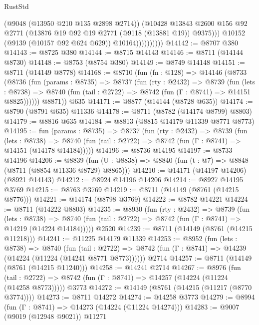 \begin{lexlean}{RustStd}
\begin{coremodule}
                          (@9048 (@13950 @210 @135 @2898 @2714))
                          (@10428
                            @13843
                            @2600
                            @156
                            @92
                            @2771
                            (@13876 @19 @92 @19 @2771 (@9118 (@13881 @19)) @9375)))
                        @10152
                        (@9139 (@10157 @92 @624 @629))
                        @10164))))))))))
@14142 := @8707 @380
@14143 := @8725 @380
@14144 := @8715 @14143
@14146 := @8711 (@14144 @8730)
@14148 := @8753 (@8754 @380)
@14149 := @8749 @14148
@14151 := @8711 (@14149 @8778)
@14168 := @8710
    (fun (fn : @128) =>
    @14146
      (@8733
        (@8736
          (fun (params : @8735) =>
          @8737
            (fun (rty : @2432) =>
            @8739
              (fun (lets : @8738) =>
              @8740 (fun (tail : @2722) => @8742 (fun (Γ : @8741) => @14151 @8825))))))
        @8871))
    @635
@14171 := @8877 (@14144 (@8728 @635))
@14174 := @8790 (@8791 @635) @11336
@14178 := @8711 (@8782 (@14174 @8799) @8803)
@14179 := @8816 @635
@14184 := @8813 (@8815 @14179 @11339 @8771 @8773)
@14195 := fun (params : @8735) =>
  @8737
    (fun (rty : @2432) =>
    @8739
      (fun (lets : @8738) =>
      @8740 (fun (tail : @2722) => @8742 (fun (Γ : @8741) => @14151 (@14178 @14184)))))
@14196 := @8736 @14195
@14197 := @8733 @14196
@14206 := @8839
    (fun (U : @8838) => @8840 (fun (t : @7) => @8848 (@8711 (@8854 @11336 @8729) @8865)))
@14210 := @14171 (@14197 @14206) (@8921 @14143)
@14212 := @8924 @14196 @14206
@14214 := @8927 @14195 @3769
@14215 := @8763 @3769
@14219 := @8711 (@14149 (@8761 (@14215 @8776)))
@14221 := @14174 (@8798 @3769)
@14222 := @8782 @14221
@14224 := @8711 (@14222 @8803)
@14235 := @8930
    (fun (rty : @2432) =>
    @8739
      (fun (lets : @8738) =>
      @8740 (fun (tail : @2722) => @8742 (fun (Γ : @8741) => @14219 (@14224 @14184)))))
    @2520
@14239 := @8711 (@14149 (@8761 (@14215 @11218)))
@14241 := @11225 @14179 @11339
@14253 := @8952
    (fun (lets : @8738) =>
    @8740
      (fun (tail : @2722) =>
      @8742 (fun (Γ : @8741) => @14239 (@14224 (@11224 (@14241 @8771 @8773))))))
    @2714
@14257 := @8711 (@14149 (@8761 (@14215 @11240)))
@14258 := @14241 @2714
@14267 := @8976
    (fun (tail : @2722) => @8742 (fun (Γ : @8741) => @14257 (@14224 (@11224 (@14258 @8773)))))
    @3773
@14272 := @14149 (@8761 (@14215 (@11217 (@8770 @3774))))
@14273 := @8711 @14272
@14274 := @14258 @3773
@14279 := @8994 (fun (Γ : @8741) => @14273 (@14224 (@11224 @14274)))
@14283 := @9007 (@9019 (@12948 @9021)) @11271

\end{coremodule}
\end{lexlean}
